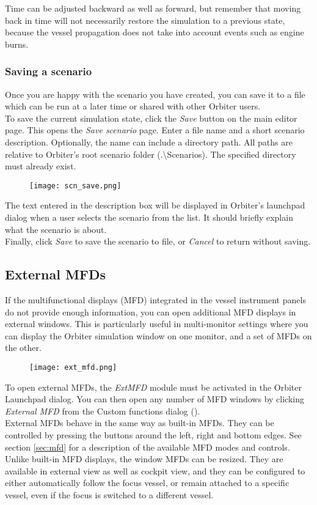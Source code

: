 \documentclass[Orbiter User Manual.tex]{subfiles}
\begin{document}
\noindent
Time can be adjusted backward as well as forward, but remember that moving back in time will not necessarily restore the simulation to a previous state, because the vessel propagation does not take into account events such as engine burns.

\subsubsection{Saving a scenario}
Once you are happy with the scenario you have created, you can save it to a file which can be run at a later time or shared with other Orbiter users.\\
To save the current simulation state, click the \textit{Save} button on the main editor page. This opens the \textit{Save scenario} page. Enter a file name and a short scenario description. Optionally, the name can include a directory path. All paths are relative to Orbiter's root scenario folder (.\textbackslash Scenarios). The specified directory must already exist.

\begin{figure}[H]
	\centering
	\texttt{[image: scn\_save.png]}
\end{figure}

\noindent
The text entered in the description box will be displayed in Orbiter's launchpad dialog when a user selects the scenario from the list. It should briefly explain what the scenario is about.\\
Finally, click \textit{Save} to save the scenario to file, or \textit{Cancel} to return without saving.


\subsection{External MFDs}
If the multifunctional displays (MFD) integrated in the vessel instrument panels do not provide enough information, you can open additional MFD displays in external windows. This is particularly useful in multi-monitor settings where you can display the Orbiter simulation window on one monitor, and a set of MFDs on the other.

\begin{figure}[H]
	\centering
	\texttt{[image: ext\_mfd.png]}
\end{figure}

\noindent
To open external MFDs, the \textit{ExtMFD} module must be activated in the Orbiter Launchpad dialog. You can then open any number of MFD windows by clicking \textit{External MFD} from the Custom functions dialog (\Ctrl{}).\\
External MFDs behave in the same way as built-in MFDs. They can be controlled by pressing the buttons around the left, right and bottom edges. See section \ref{sec:mfd} for a description of the available MFD modes and controls.\\
Unlike built-in MFD displays, the window MFDs can be resized. They are available in external view as well as cockpit view, and they can be configured to either automatically follow the focus vessel, or remain attached to a specific vessel, even if the focus is switched to a different vessel.
\end{document}
